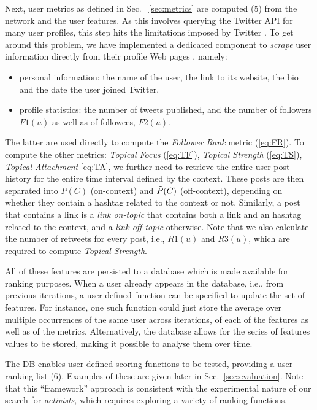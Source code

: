 Next, user metrics as defined in Sec. ~\ref{sec:metrics} are computed (5)  from the network and the user features.
%
As this involves querying the Twitter API for many user profiles, this step hits the limitations imposed by Twitter .
To get around this problem, we have implemented a dedicated component to \textit{scrape} user information directly from their profile Web pages , namely:
\begin{itemize}
	\item personal information: the name of the user, the link to its website, the bio and the date the user joined Twitter.
	\item profile statistics: the number of tweets published, and the number of followers $F1(u)$ as well as of followees, $F2(u)$.
\end{itemize}
The latter are used directly to compute  the \textit{Follower Rank} metric (\ref{eq:FR}).
To compute the other metrics: \textit{Topical Focus} (\ref{eq:TF}), \textit{Topical Strength} (\ref{eq:TS}), \textit{Topical Attachment} \ref{eq:TA}, we further need to retrieve the entire user post history for the entire time interval defined by the context.
These posts are then separated into $P(C)$ (on-context) and $\Tilde{P}(C)$ (off-context), depending on whether they contain a hashtag related to the context or not.
Similarly, a post that contains a link is a \textit{link on-topic} that contains both a link and an hashtag related to the context, and a \textit{link off-topic} otherwise.
Note that we also calculate the number of retweets for every post, i.e., $\mathit{R1}(u)$ and $\mathit{R3}(u)$, which are required to compute \textit{Topical Strength}.

All of these features are persisted to a database which is made available for ranking purposes. 
When a user already appears in the database, i.e., from previous iterations, a user-defined function can be specified to update the set of features. 
For instance, one such function could just store the average over multiple occurrences of the same user across iterations, of each of the features as well as of the metrics.
Alternatively, the database allows for the series of features values to be stored, making it possible to analyse them over time.

The DB enables user-defined scoring functions to be tested, providing a user ranking list (6). Examples of these are given later in Sec.~\ref{sec:evaluation}.
Note that this ``framework'' approach is consistent with the experimental nature of our search for \textit{activists}, which requires exploring a variety of ranking functions.

